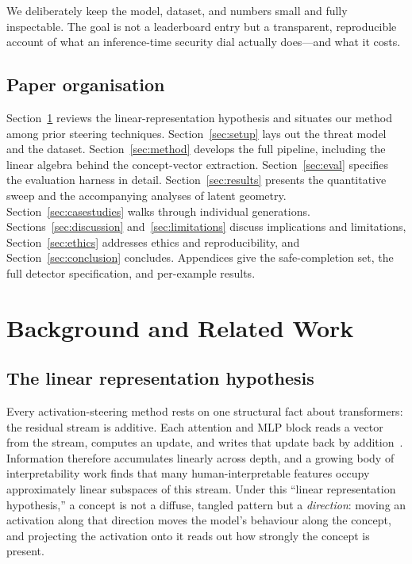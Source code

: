 \documentclass[11pt,a4paper]{article}
\begin{document}
We deliberately keep the model, dataset, and numbers small and fully inspectable. The goal is not a leaderboard entry but a transparent, reproducible account of what an inference-time security dial actually does---and what it costs.

\subsection{Paper organisation}
Section~\ref{sec:background} reviews the linear-representation hypothesis and situates our method among prior steering techniques. Section~\ref{sec:setup} lays out the threat model and the dataset. Section~\ref{sec:method} develops the full pipeline, including the linear algebra behind the concept-vector extraction. Section~\ref{sec:eval} specifies the evaluation harness in detail. Section~\ref{sec:results} presents the quantitative sweep and the accompanying analyses of latent geometry. Section~\ref{sec:casestudies} walks through individual generations. Sections~\ref{sec:discussion} and~\ref{sec:limitations} discuss implications and limitations, Section~\ref{sec:ethics} addresses ethics and reproducibility, and Section~\ref{sec:conclusion} concludes. Appendices give the safe-completion set, the full detector specification, and per-example results.

\section{Background and Related Work}
\label{sec:background}

\subsection{The linear representation hypothesis}
Every activation-steering method rests on one structural fact about transformers: the residual stream is additive. Each attention and MLP block reads a vector from the stream, computes an update, and writes that update back by addition~\cite{elhage2021mathematical}. Information therefore accumulates linearly across depth, and a growing body of interpretability work finds that many human-interpretable features occupy approximately linear subspaces of this stream. Under this ``linear representation hypothesis,'' a concept is not a diffuse, tangled pattern but a \emph{direction}: moving an activation along that direction moves the model's behaviour along the concept, and projecting the activation onto it reads out how strongly the concept is present.
\end{document}
